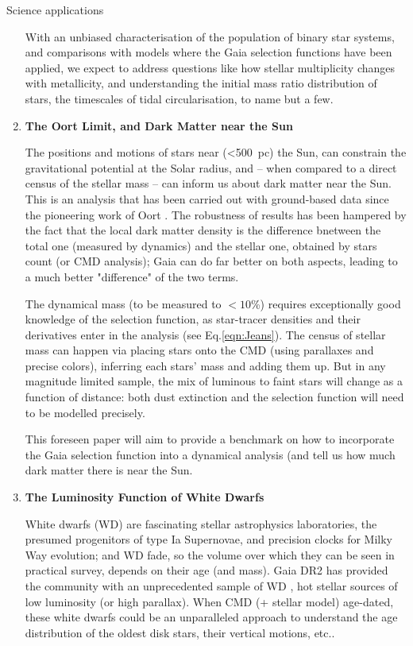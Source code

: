 \begin{workpackage}{Science applications}
\begin{wpobjectives}
\begin{enumerate}
{        With an unbiased characterisation of the population of binary star systems, and comparisons with models where the Gaia selection functions have been applied, we expect to address questions like how stellar multiplicity changes with metallicity, and understanding the initial mass ratio distribution of stars, the timescales of tidal circularisation, to name but a few.}
      \item \textbf{The Oort Limit, and Dark Matter near the Sun}{
      The positions and motions of stars near (<500~pc) the Sun, can constrain the gravitational potential at the Solar radius, and -- when compared to a direct census of the stellar mass -- can inform us about dark matter near the Sun. This is an analysis that has been carried out with ground-based data since the pioneering work of Oort \citep[e.g.][]{Read2014}. The robustness of results has been hampered by the fact that the local dark matter density is the difference bnetween the total one (measured by dynamics) and the stellar one, obtained by stars count (or CMD analysis); Gaia can do far better on both aspects, leading to a much better "difference" of the two terms. 
      
      The dynamical mass (to be measured to $<10$\%) requires exceptionally good knowledge of the selection function, as star-tracer densities and their derivatives enter in the analysis (see Eq.\ref{eqn:Jeans}). The census of stellar mass can happen via placing stars onto the CMD (using parallaxes and precise colors), inferring each stars' mass and adding them up. But in any magnitude limited sample, the mix of luminous to faint stars will change as a function of distance: both dust extinction and the selection function will need to be modelled precisely. 
      
      This foreseen paper will aim  to provide a benchmark on how to incorporate the Gaia selection function into a dynamical analysis (and tell us how much dark matter there is near the Sun.}
      
     
      \item \textbf{The Luminosity Function of White Dwarfs}{
      White dwarfs (WD) are fascinating stellar astrophysics laboratories, the presumed progenitors of type Ia Supernovae, and precision clocks for Milky Way evolution; and WD fade, so the volume over which they can be seen in practical survey, depends on their age (and mass).
      Gaia DR2 has provided the community with an unprecedented sample of WD \citep{WD_DR2}, hot stellar sources of low luminosity (or high parallax).
      When CMD (+ stellar model) age-dated, these white dwarfs could be an unparalleled approach to understand the age distribution of the oldest disk stars, their vertical motions, etc..
      
}
\end{enumerate}
\end{wpobjectives}
\end{workpackage}
